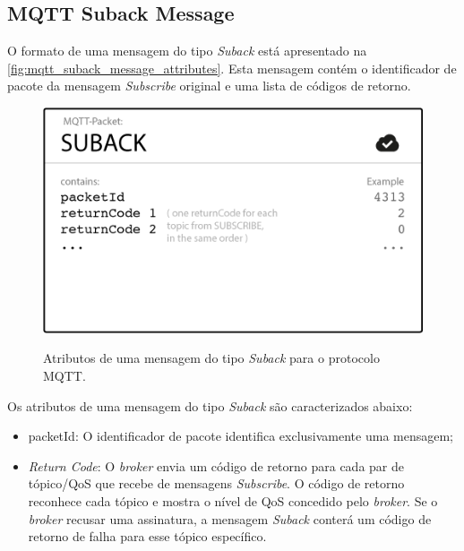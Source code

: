 \subsection{MQTT Suback Message}\label{subsection:mqtt_suback_message}

O formato de uma mensagem do tipo \textit{Suback} está apresentado na \autoref{fig:mqtt_suback_message_attributes}. Esta mensagem contém o identificador de pacote da mensagem \textit{Subscribe} original e uma lista de códigos de retorno.

\begin{figure}[htbp]
	\centering
	\caption{Atributos de uma mensagem do tipo \textit{Suback} para o protocolo MQTT.}
	\includegraphics[scale=0.5]{Imagens/mqtt_suback_message_attributes.png}
	\label{fig:mqtt_suback_message_attributes}
\end{figure}

Os atributos de uma mensagem do tipo \textit{Suback} são caracterizados abaixo:

\begin{itemize}
	\item packetId: O identificador de pacote identifica exclusivamente uma mensagem;
	\item \textit{Return Code}: O \textit{broker} envia um código de retorno para cada par de tópico/QoS que recebe de mensagens \textit{Subscribe}. O código de retorno reconhece cada tópico e mostra o nível de QoS concedido pelo \textit{broker}. Se o \textit{broker} recusar uma assinatura, a mensagem \textit{Suback} conterá um código de retorno de falha para esse tópico específico.
\end{itemize}

